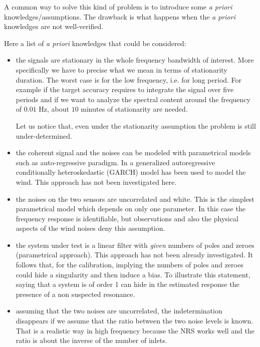 A common way to solve this kind of problem is to introduce some {\it a priori} knowledges/assumptions. The drawback is what happens when the {\it a priori} knowledges are not well-verified.

Here a list of {\it a priori} knowledges that could be considered:
\begin{itemize}
\item
 the signals are stationary in the whole frequency bandwidth of interest. More specifically we have to precise what we mean in terms of stationarity duration. The worst case  is for the low frequency, i.e. for long period. For example if the target accuracy requires to integrate the signal over five periods and if we want to analyze the spectral content around the frequency of $0.01$ Hz, about $10$ minutes of stationarity are needed.
 
Let us notice that, even under the stationarity assumption the problem is still under-determined.
 

  \item
the coherent signal and the noises can be modeled with parametrical models such as auto-regressive paradigm. In \cite{frazier:2013} a generalized autoregressive conditionally heteroskedastic (GARCH) model has been used to model the wind. This approach has not been investigated here.

  \item
 the noises on the two sensors are uncorrelated and white. This is the simplest parametrical model which depends on only one parameter. In this case the frequency response is identifiable, but observations and also the physical aspects of the wind noises deny this assumption.
   \item
the system under test is a linear filter with {\it given} numbers of poles and zeroes (parametrical approach). This approach has not been already investigated. It follows that, for the calibration, implying the numbers of poles and zeroes could hide a singularity and then induce a bias. To illustrate this statement, saying that a system is of order 1 can hide in the estimated response the presence of a non suspected resonance.  

\item
assuming that the two noises are uncorrelated, the indetermination disappears if  we assume that the ratio between the two noise levels is known. That is a realistic way in high frequency because the NRS works well and the ratio is about the inverse of the number of inlets.


\end{itemize}

